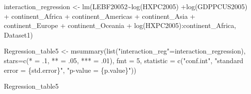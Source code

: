 \documentclass[
]{article}
\newenvironment{Shaded}{\begin{snugshade}}{\end{snugshade}}
\newcommand{\AttributeTok}[1]{\textcolor[rgb]{0.77,0.63,0.00}{#1}}
\newcommand{\DecValTok}[1]{\textcolor[rgb]{0.00,0.00,0.81}{#1}}
\newcommand{\FunctionTok}[1]{\textcolor[rgb]{0.00,0.00,0.00}{#1}}
\newcommand{\NormalTok}[1]{#1}
\newcommand{\OtherTok}[1]{\textcolor[rgb]{0.56,0.35,0.01}{#1}}
\newcommand{\SpecialCharTok}[1]{\textcolor[rgb]{0.00,0.00,0.00}{#1}}
\newcommand{\StringTok}[1]{\textcolor[rgb]{0.31,0.60,0.02}{#1}}
\begin{document}
\begin{Shaded}
\begin{Highlighting}[]
\NormalTok{interaction\_regression }\OtherTok{\textless{}{-}} \FunctionTok{lm}\NormalTok{(LEBF20052}\SpecialCharTok{\textasciitilde{}}\FunctionTok{log}\NormalTok{(HXPC2005) }
                          \SpecialCharTok{+}\FunctionTok{log}\NormalTok{(GDPPCUS2005) }
                          \SpecialCharTok{+}\NormalTok{ continent\_Africa }
                          \SpecialCharTok{+}\NormalTok{ continent\_Americas }
                          \SpecialCharTok{+}\NormalTok{ continent\_Asia }
                          \SpecialCharTok{+}\NormalTok{ continent\_Europe}
                          \SpecialCharTok{+}\NormalTok{ continent\_Oceania }
                          \SpecialCharTok{+} \FunctionTok{log}\NormalTok{(HXPC2005)}\SpecialCharTok{:}\NormalTok{continent\_Africa, Dataset1)}

\NormalTok{Regression\_table5 }\OtherTok{\textless{}{-}} \FunctionTok{msummary}\NormalTok{(}\FunctionTok{list}\NormalTok{(}\StringTok{"interaction\_reg"}\OtherTok{=}\NormalTok{interaction\_regression),}
                              \AttributeTok{stars=}\FunctionTok{c}\NormalTok{(}\StringTok{\textquotesingle{}*\textquotesingle{}} \OtherTok{=}\NormalTok{ .}\DecValTok{1}\NormalTok{, }\StringTok{\textquotesingle{}**\textquotesingle{}} \OtherTok{=}\NormalTok{ .}\DecValTok{05}\NormalTok{, }\StringTok{\textquotesingle{}***\textquotesingle{}} \OtherTok{=}\NormalTok{ .}\DecValTok{01}\NormalTok{),}
                              \AttributeTok{fmt =} \DecValTok{5}\NormalTok{,  }\AttributeTok{statistic =} \FunctionTok{c}\NormalTok{(}\StringTok{"conf.int"}\NormalTok{,  }
                                                      \StringTok{"standard error = \{std.error\}"}\NormalTok{, }
                                            \StringTok{"p{-}value = \{p.value\}"}\NormalTok{))}


\NormalTok{Regression\_table5}
\end{Highlighting}
\end{Shaded}
\end{document}
